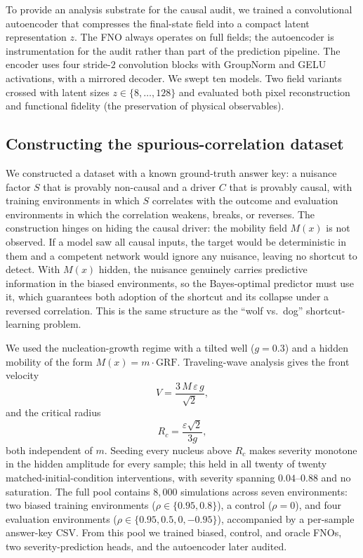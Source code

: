 \documentclass[11pt]{article}
\begin{document}
To provide an analysis substrate for the causal audit, we trained a convolutional autoencoder that
compresses the final-state field into a compact latent representation $z$. The FNO always operates
on full fields; the autoencoder is instrumentation for the audit rather than part of the prediction
pipeline. The encoder uses four stride-$2$ convolution blocks with GroupNorm and GELU activations,
with a mirrored decoder. We swept ten models. Two field variants crossed with latent sizes
$z \in \{8,\dots,128\}$ and evaluated both pixel reconstruction and functional fidelity (the
preservation of physical observables).

\subsection{Constructing the spurious-correlation dataset}

We constructed a dataset with a known ground-truth answer key: a nuisance factor $S$ that is
provably non-causal and a driver $C$ that is provably causal, with training environments in which
$S$ correlates with the outcome and evaluation environments in which the correlation weakens,
breaks, or reverses. The construction hinges on hiding the causal driver: the mobility field $M(x)$
is not observed. If a model saw all causal inputs, the target would be deterministic in them and a
competent network would ignore any nuisance, leaving no shortcut to detect. With $M(x)$ hidden,
the nuisance genuinely carries predictive information in the biased environments, so the
Bayes-optimal predictor must use it, which guarantees both adoption of the shortcut and its
collapse under a reversed correlation. This is the same structure as the ``wolf vs.\ dog''
shortcut-learning problem.

We used the nucleation-growth regime with a tilted well ($g=0.3$) and a hidden mobility of the form
$M(x) = m\cdot\text{GRF}$. Traveling-wave analysis gives the front velocity
\begin{equation}
V = \frac{3\,M\,\varepsilon\,g}{\sqrt{2}},
\label{eq:front-velocity}
\end{equation}
and the critical radius
\begin{equation}
R_c = \frac{\varepsilon\sqrt{2}}{3g},
\label{eq:critical-radius}
\end{equation}
both independent of $m$. Seeding every nucleus above $R_c$ makes severity monotone in the hidden
amplitude for every sample; this held in all twenty of twenty matched-initial-condition
interventions, with severity spanning $0.04$--$0.88$ and no saturation. The full pool contains
$8{,}000$ simulations across seven environments: two biased training environments
($\rho \in \{0.95, 0.8\}$), a control ($\rho = 0$), and four evaluation environments
($\rho \in \{0.95, 0.5, 0, -0.95\}$), accompanied by a per-sample answer-key CSV. From this pool we
trained biased, control, and oracle FNOs, two severity-prediction heads, and the autoencoder later
audited.
\end{document}
